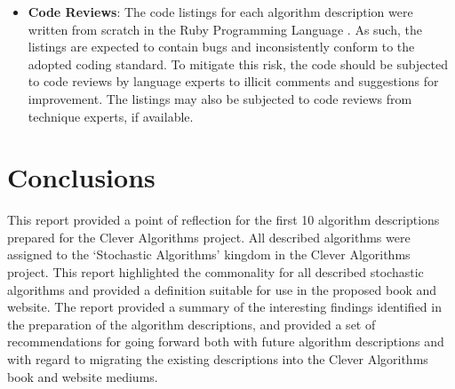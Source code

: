 \documentclass[a4paper, 11pt]{article}
\begin{document}
\begin{itemize}
	\item \textbf{Code Reviews}: The code listings for each algorithm description were written from scratch in the Ruby Programming Language \cite{Brownlee2010o}. As such, the listings are expected to contain bugs and inconsistently conform to the adopted coding standard. To mitigate this risk, the code should be subjected to code reviews by language experts to illicit comments and suggestions for improvement. The listings may also be subjected to code reviews from technique experts, if available.
\end{itemize}

% 
% 
\section{Conclusions}
\label{sec:conclusions}
This report provided a point of reflection for the first 10 algorithm descriptions prepared for the Clever Algorithms project. All described algorithms were assigned to the `Stochastic Algorithms' kingdom in the Clever Algorithms project. This report highlighted the commonality for all described stochastic algorithms and provided a definition suitable for use in the proposed book and website.
The report provided a summary of the interesting findings identified in the preparation of the algorithm descriptions, and provided a set of recommendations for going forward both with future algorithm descriptions and with regard to migrating the existing descriptions into the Clever Algorithms book and website mediums.



\end{document}
